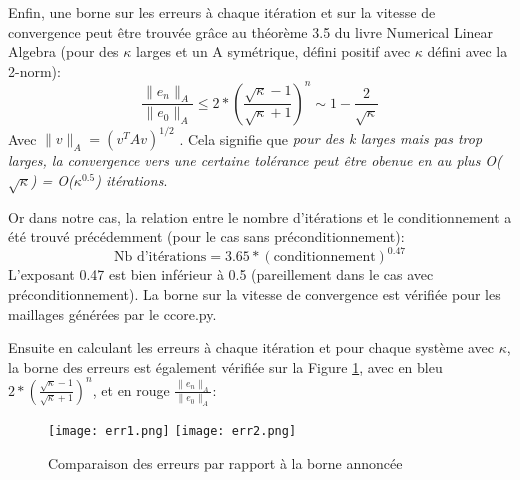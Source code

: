 \documentclass[11pt]{article}
\begin{document}
Enfin, une borne sur les erreurs à chaque itération et sur la vitesse de convergence peut être trouvée grâce au théorème 3.5 du livre Numerical Linear Algebra \cite{num} (pour des $\kappa$ larges et un A symétrique, défini positif avec $\kappa$ défini avec la 2-norm): 
\[\frac{\|e_n\|_A}{\|e_0\|_A} \leq 2*(\frac{\sqrt{\kappa}-1}{\sqrt{\kappa}+1})^n \sim 1 - \frac{2}{\sqrt{\kappa}}
\]
Avec $\|v\|_A = (v^TAv)^{1/2}$ . Cela signifie que \textit{pour des k larges mais pas trop larges, la convergence vers une certaine tolérance peut être obenue en au plus O($\sqrt{\kappa}$) = O($\kappa^{0.5}$) itérations}\cite{num}. 

Or dans notre cas, la relation entre le nombre d'itérations et le conditionnement a été trouvé précédemment (pour le cas sans préconditionnement): 
\[ \mbox{Nb d'itérations} = 3.65 * (\mbox{conditionnement})^{0.47}\]
L'exposant 0.47 est bien inférieur à 0.5 (pareillement dans le cas avec préconditionnement). La borne sur la vitesse de convergence est vérifiée pour les maillages générées par le ccore.py.

Ensuite en calculant les erreurs à chaque itération et pour chaque système avec $\kappa$, la borne des erreurs est également vérifiée sur la Figure \ref{fig:err}, avec en bleu $2*(\frac{\sqrt{\kappa}-1}{\sqrt{\kappa}+1})^n$, et en rouge $\frac{\|e_n\|_A}{\|e_0\|_A}$: 
\begin{figure}[h!]
    \vspace*{-4mm}
    \centering
    \texttt{[image: err1.png]}
    \texttt{[image: err2.png]}
        \vspace*{-4mm}

    \caption{Comparaison des erreurs par rapport à la borne annoncée}
    \label{fig:err}
    \vspace*{-7mm}
\end{figure}
\end{document}
